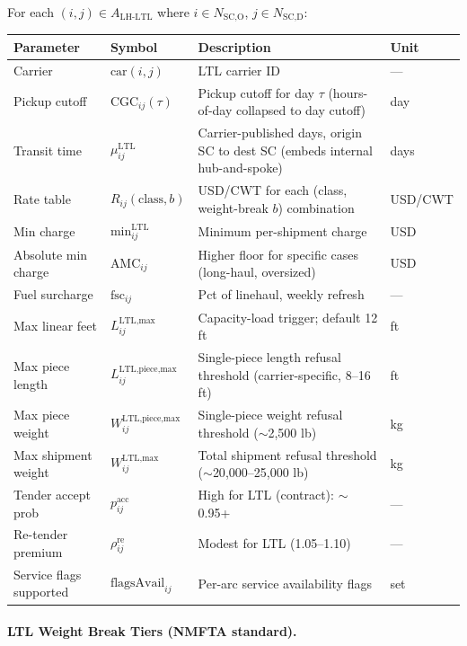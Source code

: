 \documentclass[11pt,a4paper]{article}
\theoremstyle{definition}
\begin{document}
For each $(i,j) \in A_{\text{LH-LTL}}$ where $i \in N_{\text{SC,O}}$, $j \in N_{\text{SC,D}}$:
\begin{center}
\begin{tabular}{llp{6cm}l}
\toprule
Parameter & Symbol & Description & Unit \\
\midrule
Carrier & $\text{car}(i,j)$ & LTL carrier ID & — \\
Pickup cutoff & $\text{CGC}_{ij}(\tau)$ & Pickup cutoff for day $\tau$ (hours-of-day collapsed to day cutoff) & day \\
Transit time & $\mu_{ij}^{\text{LTL}}$ & Carrier-published days, origin SC to dest SC (embeds internal hub-and-spoke) & days \\
Rate table & $R_{ij}(\text{class}, b)$ & USD/CWT for each (class, weight-break $b$) combination & USD/CWT \\
Min charge & $\text{min}_{ij}^{\text{LTL}}$ & Minimum per-shipment charge & USD \\
Absolute min charge & $\text{AMC}_{ij}$ & Higher floor for specific cases (long-haul, oversized) & USD \\
Fuel surcharge & $\text{fsc}_{ij}$ & Pct of linehaul, weekly refresh & — \\
Max linear feet & $L_{ij}^{\text{LTL,max}}$ & Capacity-load trigger; default 12 ft & ft \\
Max piece length & $L_{ij}^{\text{LTL,piece,max}}$ & Single-piece length refusal threshold (carrier-specific, 8--16 ft) & ft \\
Max piece weight & $W_{ij}^{\text{LTL,piece,max}}$ & Single-piece weight refusal threshold ($\sim$2{,}500 lb) & kg \\
Max shipment weight & $W_{ij}^{\text{LTL,max}}$ & Total shipment refusal threshold ($\sim$20{,}000--25{,}000 lb) & kg \\
Tender accept prob & $p_{ij}^{\text{acc}}$ & High for LTL (contract): $\sim$0.95+ & — \\
Re-tender premium & $\rho_{ij}^{\text{re}}$ & Modest for LTL (1.05--1.10) & — \\
Service flags supported & $\text{flagsAvail}_{ij}$ & Per-arc service availability flags & set \\
\bottomrule
\end{tabular}
\end{center}

\paragraph{LTL Weight Break Tiers (NMFTA standard).}
\end{document}
